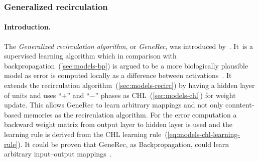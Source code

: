 \subsubsection{Generalized recirculation}
\label{sec:models-generec} 

\paragraph{Introduction.} 
The \emph{Generalized recirculation algorithm}, or \emph{GeneRec}, was introduced by~\citet{o1996bio}. It~is a supervised learning algorithm which in comparison with backpropagation~(\ref{sec:models-bp}) is argued to be a more biologically plausible model as error is computed locally as a difference between activations~\citep{o1998six, o2001generalization, da2011advances, schneider2009application}. It extends the recirculation algorithm~(\ref{sec:models-recirc}) by having a hidden layer of units and uses ``$+$'' and ``$-$'' phases as CHL~(\ref{sec:models-chl}) for weight update. This allows GeneRec to learn arbitrary mappings and not only conntent-based memories as the recirculation algorithm. For the error computation a backward weight matrix from output layer to hidden layer is used and the learning rule is derived from the CHL learning rule~(\ref{eq:models-chl-learning-rule}). It could be proven that GeneRec, as Backpropagation, could learn arbitrary input--output mappings~\citep{o1996bio}. 

